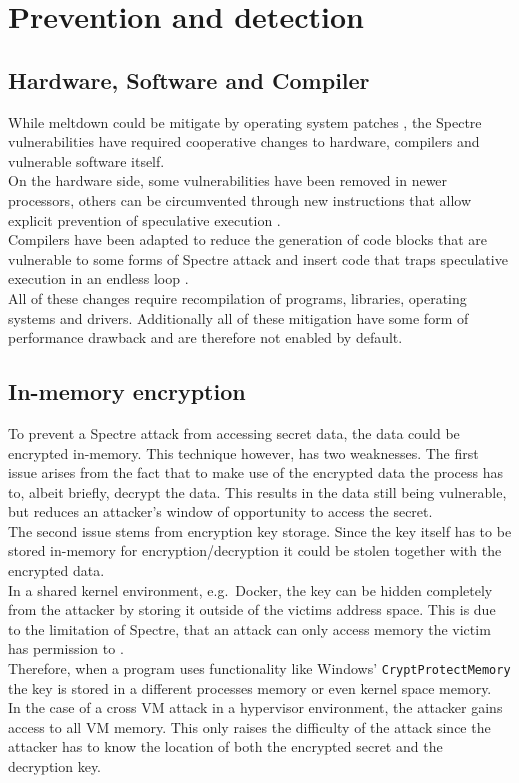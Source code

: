 \documentclass[conference,compsoc,final,a4paper]{IEEEtran}
\begin{document}
\section{Prevention and detection}
\subsection{Hardware, Software and Compiler}
While meltdown could be mitigate by operating system patches \cite{linuxKAISER}, the Spectre vulnerabilities have required cooperative changes to hardware, compilers and vulnerable software itself. \\
On the hardware side, some vulnerabilities have been removed in newer processors, others can be circumvented through new instructions that allow explicit prevention of speculative execution \cite{intelMitigation}. \\
Compilers have been adapted to reduce the generation of code blocks that are vulnerable to some forms of Spectre attack \cite{msvcQSpectre} and insert code that traps speculative execution in an endless loop \cite{retpolineTurner}. \\
All of these changes require recompilation of programs, libraries, operating systems and drivers. Additionally all of these mitigation have some form of performance drawback and are therefore not enabled by default.
\subsection{In-memory encryption}
To prevent a Spectre attack from accessing secret data, the data could be encrypted in-memory. This technique however, has two weaknesses. The first issue arises from the fact that to make use of the encrypted data the process has to, albeit briefly, decrypt the data. This results in the data still being vulnerable, but reduces an attacker's window of opportunity to access the secret. \\
The second issue stems from encryption key storage. Since the key itself has to be stored in-memory for encryption/decryption it could be stolen together with the encrypted data. \\
In a shared kernel environment, e.g.\  Docker, the key can be hidden completely from the attacker by storing it outside of the victims address space. This is due to the limitation of Spectre, that an attack can only access memory the victim has permission to \cite{kocher2018spectre}. \\
Therefore, when a program uses functionality like Windows' \lstinline|CryptProtectMemory| \cite{winCryptMem} the key is stored in a different processes memory or even kernel space memory. \\
In the case of a cross VM attack in a hypervisor environment, the attacker gains access to all VM memory. This only raises the difficulty of the attack since the attacker has to know the location of both the encrypted secret and the decryption key.
\end{document}

